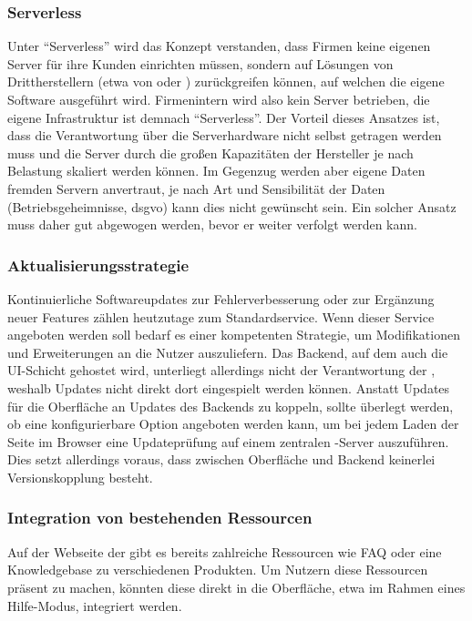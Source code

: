 \subsubsection{Serverless}
Unter ``Serverless'' wird das Konzept verstanden, dass Firmen keine eigenen Server für ihre Kunden einrichten müssen, sondern auf Lösungen von Drittherstellern (etwa  von  oder ) zurückgreifen können, auf welchen die eigene Software ausgeführt wird. Firmenintern wird also kein Server betrieben, die eigene Infrastruktur ist demnach ``Serverless''. Der Vorteil dieses Ansatzes ist, dass die Verantwortung über die Serverhardware nicht selbst getragen werden muss und die Server durch die großen Kapazitäten der Hersteller je nach Belastung skaliert werden können. Im Gegenzug werden aber eigene Daten fremden Servern anvertraut, je nach Art und Sensibilität der Daten (Betriebsgeheimnisse, \gls{dsgvo}) kann dies nicht gewünscht sein. Ein solcher Ansatz muss daher gut abgewogen werden, bevor er weiter verfolgt werden kann.

\subsubsection{Aktualisierungsstrategie}
Kontinuierliche Softwareupdates zur Fehlerverbesserung oder zur Ergänzung neuer Features zählen heutzutage zum Standardservice. Wenn dieser Service angeboten werden soll bedarf es einer kompetenten Strategie, um Modifikationen und Erweiterungen an die Nutzer auszuliefern. Das Backend, auf dem auch die UI-Schicht gehostet wird, unterliegt allerdings nicht der Verantwortung der , weshalb Updates nicht direkt dort eingespielt werden können. Anstatt Updates für die Oberfläche an Updates des Backends zu koppeln, sollte überlegt werden, ob eine konfigurierbare Option angeboten werden kann, um bei jedem Laden der Seite im Browser eine Updateprüfung auf einem zentralen -Server auszuführen. Dies setzt allerdings voraus, dass zwischen Oberfläche und Backend keinerlei Versionskopplung besteht. 

\subsubsection{Integration von bestehenden Ressourcen}
Auf der Webseite der  gibt es bereits zahlreiche Ressourcen wie FAQ oder eine Knowledgebase zu verschiedenen Produkten. Um Nutzern diese Ressourcen präsent zu machen, könnten diese direkt in die Oberfläche, etwa im Rahmen eines Hilfe-Modus, integriert werden.

